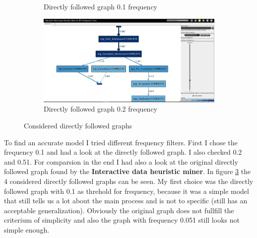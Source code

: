 \begin{figure}[!htbp]
\begin{subfigure}{.4\textwidth}
  \caption{Directly followed graph 0.1 frequency}
  \label{fig:APP_DFG0-1}
\end{subfigure}
\begin{subfigure}{.4\textwidth}
  \centering
  \includegraphics[width=\linewidth]{App_DirectlyFollowedFreq0-2.PNG}
  \caption{Directly followed graph 0.2 frequency}
  \label{fig:APP_DFG0-2}
\end{subfigure}
\caption{Considered directly followed graphs}
\label{fig:App_Direct}
\end{figure}

To find an accurate model I tried different frequency filters. First I chose the frequency 0.1 and had a look at the directly followed graph. I also checked 0.2 and 0.51. For comparsion in the end I had also a look at the original directly followed graph found by the \textbf{Interactive data heuristic miner}. In figure \ref{fig:App_Direct} the 4 considered directly followed graphs can be seen. My first choice was the directly followed graph with 0.1 as threhold for frequency, because it was a simple model that still tells us a lot about the main process and is not to specific (still has an acceptable generalization). Obviously the original graph does not fullfill the criterium of simplicity and also the graph with frequency 0.051 still looks not simple enough.

